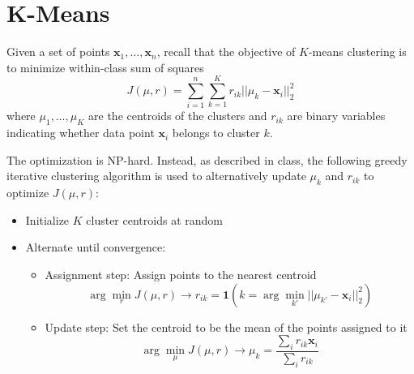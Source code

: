 \section{K-Means }
Given a set of points $\mathbf{x}_1, \dots, \mathbf{x}_n$, recall that the objective of $K$-means clustering is to minimize within-class sum of squares
\begin{equation*}
  \label{eq:kmeans-model}
	J(\mu,r) = \sum_{i=1}^n\sum_{k=1}^K r_{ik} ||\mu_k-\mathbf{x}_i||^2_2
  \end{equation*}
where $\mu_1,\ldots,\mu_K$ are the centroids of the clusters and $r_{ik}$ are binary variables indicating whether data point $\mathbf{x}_i$ belongs to cluster $k$. 

The optimization is NP-hard. Instead, as described in class, 
the following greedy iterative clustering algorithm is used to alternatively update $\mu_k$ and $r_{ik}$ to optimize $J(\mu,r)$:
\begin{itemize}
 \item Initialize $K$ cluster centroids at random
 \item  Alternate until convergence:
\begin{itemize}
  \item  Assignment step: Assign points to the nearest centroid\\
\begin{equation*}
\arg \min_r J(\mu,r) \rightarrow r_{ik} = \textbf{1}(k = \arg \min_{k'} ||\mu_{k'} - \mathbf{x}_i||_2^2)
 \end{equation*}
 
  \item  Update step: Set the centroid to be the mean of the points assigned to it\\
  \begin{equation*}
 \arg \min_\mu J(\mu,r) \rightarrow \mu_k = \frac{\sum_i r_{ik} \mathbf{x}_i}{\sum_i r_{ik}}
  \end{equation*}
  \end{itemize}
\end{itemize}


